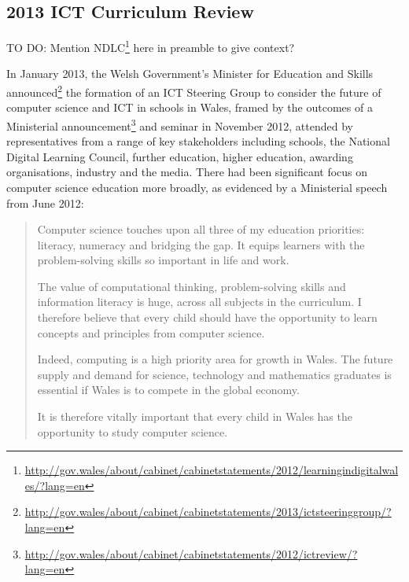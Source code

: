 \documentclass{sig-alternate}
\begin{document}
%

\subsection{2013 ICT Curriculum Review}


TO DO: Mention
NDLC\footnote{\url{http://gov.wales/about/cabinet/cabinetstatements/2012/learningindigitalwales/?lang=en}}
here in preamble to give context?

In January 2013, the Welsh Government's Minister for Education and
Skills
announced\footnote{\url{http://gov.wales/about/cabinet/cabinetstatements/2013/ictsteeringgroup/?lang=en}}
the formation of an ICT Steering Group to consider the future of
computer science and ICT in schools in Wales, framed by the outcomes
of a Ministerial
announcement\footnote{\url{http://gov.wales/about/cabinet/cabinetstatements/2012/ictreview/?lang=en}}
and seminar in November 2012, attended by representatives from a range
of key stakeholders including schools, the National Digital Learning
Council, further education, higher education, awarding organisations,
industry and the media. There had been significant focus on computer
science education more broadly, as evidenced by a Ministerial speech
from June 2012:

\begin{quotation}
Computer science touches upon all three of my education priorities:
literacy, numeracy and bridging the gap. It equips learners with the
problem-solving skills so important in life and work.

The value of computational thinking, problem-solving skills and
information literacy is huge, across all subjects in the curriculum. I
therefore believe that every child should have the opportunity to
learn concepts and principles from computer science.

Indeed, computing is a high priority area for growth in Wales. The
future supply and demand for science, technology and mathematics
graduates is essential if Wales is to compete in the global economy.

It is therefore vitally important that every child in Wales has the
opportunity to study computer science.
\end{quotation}
\end{document}
